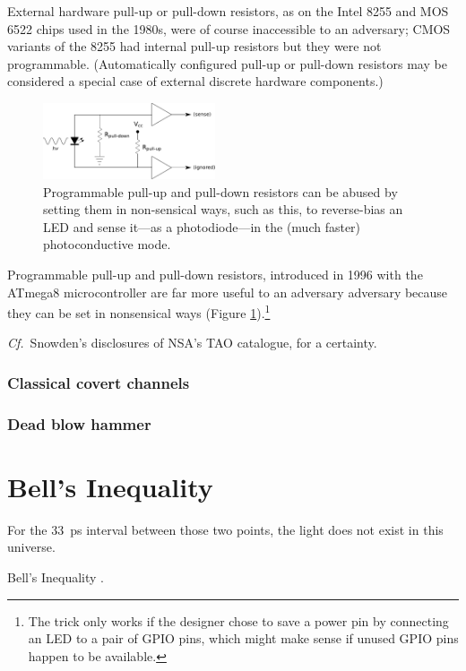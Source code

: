 \documentclass[a4paper,twoside,11pt]{book}
\begin{document}
External hardware pull-up or pull-down resistors, as on the Intel 8255 and MOS
6522 chips used in the 1980s, were of course inaccessible to an adversary; CMOS
variants of the 8255 had internal pull-up resistors but they were not
programmable. (Automatically configured pull-up or pull-down resistors may be
considered a special case of external discrete hardware components.)
\begin{figure}[ht]
  \centering
  \includegraphics[width=2in]{nonsensical.pdf}
  \caption{Programmable pull-up and pull-down resistors can be abused by
    setting them in non-sensical ways, such as this, to reverse-bias an LED
    and sense it---as a photodiode---in the (much faster) photoconductive
    mode.}
  \label{figure:nonsensical}
\end{figure}
Programmable pull-up and pull-down resistors, introduced in 1996 with the
ATmega8 microcontroller \cite{Atmel2013} are far more useful to an adversary
adversary because they can be set in nonsensical ways (Figure
\ref{figure:nonsensical}).\footnote{The trick only works if the designer chose
to save a power pin by connecting an LED to a pair of GPIO pins, which might
make sense if unused GPIO pins happen to be available.}

\emph{Cf.}\ Snowden's disclosures of NSA's TAO catalogue, for a certainty.
\subsubsection{Classical covert channels}
\subsubsection{Dead blow hammer}

\section{Bell's Inequality}
For the \SI{33}{\pico\second} interval between those two points, the light does
not exist in this universe.

Bell's Inequality \cite{Bell1964}.

\end{document}

